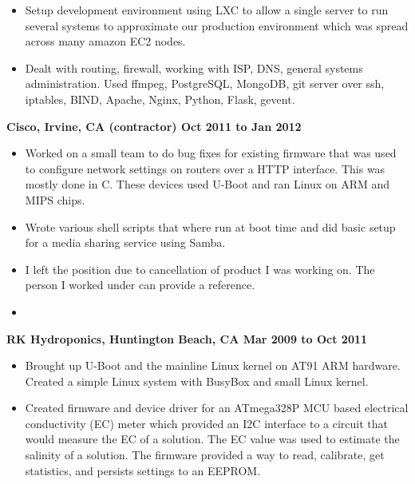 \documentclass{res}
\begin{document}
\begin{resume}
\begin{itemize}
\item
	Setup  development  environment using LXC to allow a single
	server to run several systems to approximate our production
	environment which was spread across many amazon EC2 nodes.

\item
	Dealt with routing, firewall, working with ISP, DNS, general
	systems administration.  Used ffmpeg, PostgreSQL, MongoDB,
	git server over ssh, iptables, BIND, Apache, Nginx, Python,
	Flask, gevent.

\end{itemize}

{\large \bf Cisco, Irvine, CA (contractor) \hfill Oct 2011 to Jan 2012}

\begin{itemize}

\item
	Worked on a small team to do bug fixes for existing firmware that was
	used to configure network settings on routers over a HTTP interface.
	This was mostly done in C.  These devices used U-Boot and ran Linux
	on ARM and MIPS chips.

\item
	Wrote various shell scripts that where run at boot time and did
	basic setup for a media sharing service using Samba.

\item
	I left the position due to cancellation of product I was
	working on.  The person I worked under can provide a reference.
\item

\end{itemize}

{\large \bf RK Hydroponics, Huntington Beach, CA \hfill Mar 2009 to
Oct 2011}

\begin{itemize}

\item
	Brought up U-Boot and the mainline Linux kernel on AT91 ARM
	hardware.  Created a simple Linux system with BusyBox and small
	Linux kernel.

\item
	Created firmware and device driver for an ATmega328P MCU
	based electrical conductivity (EC) meter which provided an I2C
	interface to a circuit that would measure the EC of a solution.
	The EC value was used to estimate the salinity of a solution.
	The firmware provided a way to read, calibrate, get statistics,
	and persists settings to an EEPROM.


\end{itemize}
\end{resume}
\end{document}
